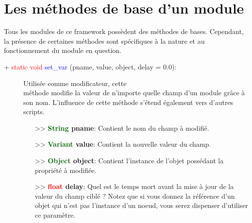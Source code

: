 \documentclass[a4paper, 11pt]{article}
\begin{document}
	\section{Les méthodes de base d'un module}
	Tous les modules de ce framework possèdent des méthodes de bases. Cependant, la présence de certaines 
	méthodes sont spécifiques à la nature et au fonctionnement du module en question.
	\begin{description}
		\item [+ \textcolor{red}{static void} \textcolor{blue}{set\_var} (pname, value, object, delay = 
		0.0):] Utilisée comme modificateur, cette \\méthode modifie la valeur de n'importe quelle champ d'un 
		module grâce à son nom. L'influence de cette méthode s'étend également vers d'autres scripts.
		\begin{itemize}
			\item [>> \textbf{\textcolor{darkgreen}{String} pname}:] Contient le nom du champ à modifié.
			\item [>> \textbf{\textcolor{darkgreen}{Variant} value}:] Contient la nouvelle valeur du champ.
			\item [>> \textbf{\textcolor{darkgreen}{Object} object}:] Contient l'instance de l'objet
			possédant la propriété à modifiée.
			\item [>> \textbf{\textcolor{red}{float} delay}:] Quel est le temps mort avant la mise à jour de 
			la valeur du champ ciblé ? Notez que si vous donnez la référence d'un objet qui n'est pas 
			l'instance d'un noeud, vous serez dispenser d'utiliser ce paramètre.\\
		\end{itemize}
	\end{description}
\end{document}
